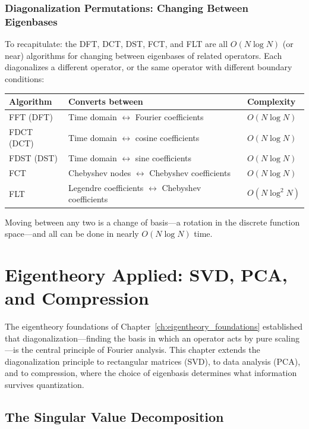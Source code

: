 \documentclass[12pt,a4paper]{report}
\theoremstyle{thms}
\theoremstyle{defns}
\begin{document}
\subsection{Diagonalization Permutations: Changing Between Eigenbases}

To recapitulate: the DFT, DCT, DST, FCT, and FLT are all $O(N \log N)$ (or near) algorithms for changing between eigenbases of related operators. Each diagonalizes a different operator, or the same operator with different boundary conditions:

\begin{center}
    \begin{tabular}{l l l}
        \hline
        \textbf{Algorithm} & \textbf{Converts between} & \textbf{Complexity} \\
        \hline
        FFT (DFT) & Time domain $\leftrightarrow$ Fourier coefficients & $O(N \log N)$ \\
        FDCT (DCT) & Time domain $\leftrightarrow$ cosine coefficients & $O(N \log N)$ \\
        FDST (DST) & Time domain $\leftrightarrow$ sine coefficients & $O(N \log N)$ \\
        FCT & Chebyshev nodes $\leftrightarrow$ Chebyshev coefficients & $O(N \log N)$ \\
        FLT & Legendre coefficients $\leftrightarrow$ Chebyshev coefficients & $O(N \log^2 N)$ \\
        \hline
    \end{tabular}
\end{center}

Moving between any two is a change of basis—a rotation in the discrete function space—and all can be done in nearly $O(N \log N)$ time.

\chapter{Eigentheory Applied: SVD, PCA, and Compression}
\label{ch:eigentheory}

The eigentheory foundations of Chapter~\ref{ch:eigentheory_foundations} established that diagonalization—finding the basis in which an operator acts by pure scaling—is the central principle of Fourier analysis. This chapter extends the diagonalization principle to rectangular matrices (SVD), to data analysis (PCA), and to compression, where the choice of eigenbasis determines what information survives quantization.

\section{The Singular Value Decomposition}
\label{sec:svd}
\end{document}
